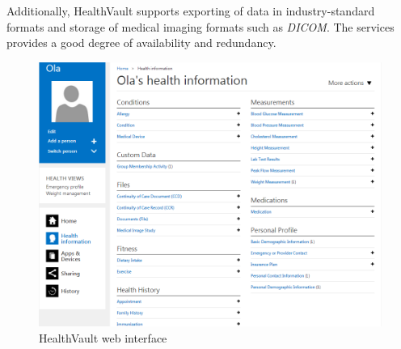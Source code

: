

Additionally, HealthVault supports exporting of data in industry-standard formats and storage
of medical imaging formats such as \textit{DICOM}. The services provides a good degree of availability and redundancy.

\begin{figure}[h]
\begin{center}
\includegraphics[scale=0.50]{../Figures/hv-page.png}
\end{center}
\caption{HealthVault web interface}
\label{figure:hv-page}
\end{figure}

